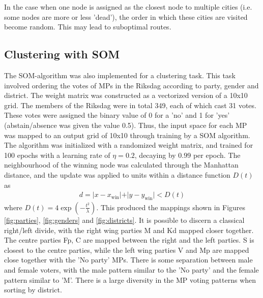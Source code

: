 \documentclass[a4paper]{article}
\begin{document}
In the case when one node is assigned as the closest node to multiple cities (i.e. some nodes are more or less 'dead'), the order in which these cities are visited become random. This may lead to suboptimal routes. 

\subsection{Clustering with SOM}

The SOM-algorithm was also implemented for a clustering task. This task involved ordering the votes of MPs in the Riksdag according to party, gender and district. The weight matrix was constructed as a vectorized version of a 10x10 grid. The members of the Riksdag were in total 349, each of which cast 31 votes. These votes were assigned the binary value of 0 for a 'no' and 1 for 'yes' (abstain/absence was given the value 0.5). Thus, the input space for each MP was mapped to an output grid of 10x10 through training by a SOM algorithm. The algorithm was initialized with a randomized weight matrix, and trained for 100 epochs with a learning rate of $\eta=0.2$, decaying by $0.99$ per epoch. The neighbourhood of the winning node was calculated through the Manhattan distance, and the update was applied to units within a distance function $D(t)$ as
\begin{align*}
  d = \vert x - x_\text{win} \vert + \vert y - y_\text{win}\vert < D(t)
\end{align*}
where $D(t) = 4 \exp{(-\frac{t^2}{\lambda})}$. This produced the mappings shown in Figures \ref{fig:parties}, \ref{fig:genders} and \ref{fig:districts}. It is possible to discern a classical right/left divide, with the right wing parties M and Kd mapped closer together. The centre parties Fp, C are mapped between the right and the left parties. S is closest to the centre parties, while the left wing parties V and Mp are mapped close together with the 'No party' MPs. There is some separation between male and female voters, with the male pattern similar to the 'No party' and the female pattern similar to 'M'. There is a large diversity in the MP voting patterns when sorting by district.
\end{document}
